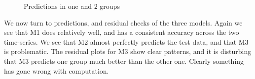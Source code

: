 \documentclass{article}
\begin{document}
\begin{figure}[ht]
    \centering
    \quad
    \quad
    \caption{Predictions in one and 2 groups}
\end{figure}

We now turn to predictions, and residual checks of the three models. Again we see that M1 does relatively well, and has a consistent accuracy across the two time-series. We see that M2 almost perfectly predicts the test data, and that M3 is problematic. The residual plots for M3 show clear patterns, and it is disturbing that M3 predicts one group much better than the other one. Clearly something has gone wrong with computation.  
\end{document}
